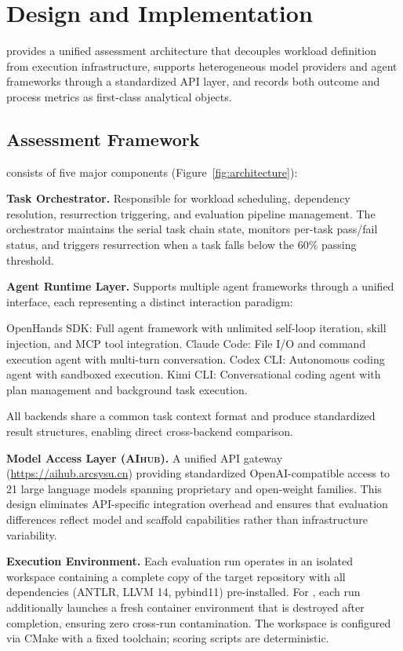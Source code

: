 \section{Design and Implementation}
\eva{} provides a unified assessment architecture that decouples workload definition from execution infrastructure, supports heterogeneous model providers and agent frameworks through a standardized API layer, and records both outcome and process metrics as first-class analytical objects.

\subsection{Assessment Framework}

\eva{} consists of five major components (Figure~\ref{fig:architecture}):

\textbf{Task Orchestrator.}
Responsible for workload scheduling, dependency resolution, resurrection triggering, and evaluation pipeline management.
The orchestrator maintains the serial task chain state, monitors per-task pass/fail status, and triggers resurrection when a task falls below the 60\% passing threshold.

\textbf{Agent Runtime Layer.}
Supports multiple agent frameworks through a unified interface, each representing a distinct interaction paradigm:

OpenHands SDK: Full agent framework with unlimited self-loop iteration, skill injection, and MCP tool integration.
Claude Code: File I/O and command execution agent with multi-turn conversation.
Codex CLI: Autonomous coding agent with sandboxed execution.
Kimi CLI: Conversational coding agent with plan management and background task execution.

All backends share a common task context format and produce standardized result structures, enabling direct cross-backend comparison.

\textbf{Model Access Layer (\textsc{AIhub}).}
A unified API gateway (\url{https://aihub.arcsysu.cn}) providing standardized OpenAI-compatible access to 21 large language models spanning proprietary and open-weight families.
This design eliminates API-specific integration overhead and ensures that evaluation differences reflect model and scaffold capabilities rather than infrastructure variability.

\textbf{Execution Environment.}
Each evaluation run operates in an isolated workspace containing a complete copy of the target repository with all dependencies (ANTLR, LLVM 14, pybind11) pre-installed.
For \zzc{\Progressive}{}, each run additionally launches a fresh container environment that is destroyed after completion, ensuring zero cross-run contamination.
The workspace is configured via CMake with a fixed toolchain; scoring scripts are deterministic.

